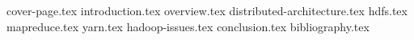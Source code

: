 \documentclass[a4paper,12pt]{article}
\begin{document}
 
 
 

{cover-page.tex}
\tableofcontents
\clearpage
{introduction.tex}
{overview.tex}
{distributed-architecture.tex}
{hdfs.tex}
{mapreduce.tex}
{yarn.tex}
{hadoop-issues.tex}
{conclusion.tex}
{bibliography.tex}
 
\end{document}
